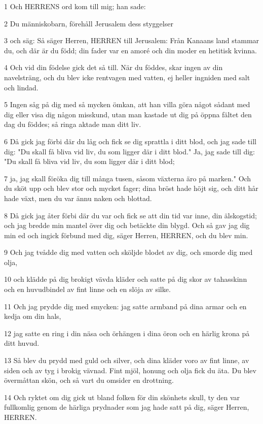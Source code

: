 \par 1 Och HERRENS ord kom till mig; han sade:
\par 2 Du människobarn, förehåll Jerusalem dess styggelser
\par 3 och säg: Så säger Herren, HERREN till Jerusalem: Från Kanaans land stammar du, och där är du född; din fader var en amoré och din moder en hetitisk kvinna.
\par 4 Och vid din födelse gick det så till. När du föddes, skar ingen av din navelsträng, och du blev icke rentvagen med vatten, ej heller ingniden med salt och lindad.
\par 5 Ingen såg på dig med så mycken ömkan, att han villa göra något sådant med dig eller visa dig någon misskund, utan man kastade ut dig på öppna fältet den dag du föddes; så ringa aktade man ditt liv.
\par 6 Då gick jag förbi där du låg och fick se dig sprattla i ditt blod, och jag sade till dig: "Du skall få bliva vid liv, du som ligger där i ditt blod." Ja, jag sade till dig: "Du skall få bliva vid liv, du som ligger där i ditt blod;
\par 7 ja, jag skall föröka dig till många tusen, såsom växterna äro på marken." Och du sköt upp och blev stor och mycket fager; dina bröst hade höjt sig, och ditt hår hade växt, men du var ännu naken och blottad.
\par 8 Då gick jag åter förbi där du var och fick se att din tid var inne, din älskogstid; och jag bredde min mantel över dig och betäckte din blygd. Och så gav jag dig min ed och ingick förbund med dig, säger Herren, HERREN, och du blev min.
\par 9 Och jag tvådde dig med vatten och sköljde blodet av dig, och smorde dig med olja,
\par 10 och klädde på dig brokigt vävda kläder och satte på dig skor av tahasskinn och en huvudbindel av fint linne och en slöja av silke.
\par 11 Och jag prydde dig med smycken: jag satte armband på dina armar och en kedja om din hals,
\par 12 jag satte en ring i din näsa och örhängen i dina öron och en härlig krona på ditt huvud.
\par 13 Så blev du prydd med guld och silver, och dina kläder voro av fint linne, av siden och av tyg i brokig vävnad. Fint mjöl, honung och olja fick du äta. Du blev övermåttan skön, och så vart du omsider en drottning.
\par 14 Och ryktet om dig gick ut bland folken för din skönhets skull, ty den var fullkomlig genom de härliga prydnader som jag hade satt på dig, säger Herren, HERREN.
